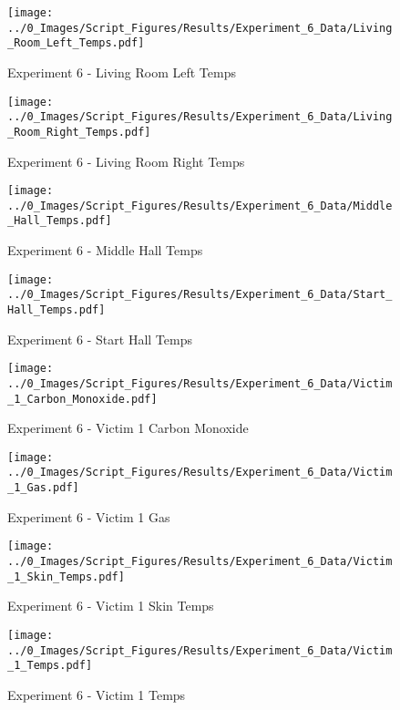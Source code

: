 	\begin{figure}[H]
		\centering
		\texttt{[image: ../0\_Images/Script\_Figures/Results/Experiment\_6\_Data/Living\_Room\_Left\_Temps.pdf]}
		\caption[]{Experiment 6 - Living Room Left Temps}
	\end{figure}
 
	\clearpage

	\begin{figure}[H]
		\centering
		\texttt{[image: ../0\_Images/Script\_Figures/Results/Experiment\_6\_Data/Living\_Room\_Right\_Temps.pdf]}
		\caption[]{Experiment 6 - Living Room Right Temps}
	\end{figure}
 

	\begin{figure}[H]
		\centering
		\texttt{[image: ../0\_Images/Script\_Figures/Results/Experiment\_6\_Data/Middle\_Hall\_Temps.pdf]}
		\caption[]{Experiment 6 - Middle Hall Temps}
	\end{figure}
 
	\clearpage

	\begin{figure}[H]
		\centering
		\texttt{[image: ../0\_Images/Script\_Figures/Results/Experiment\_6\_Data/Start\_Hall\_Temps.pdf]}
		\caption[]{Experiment 6 - Start Hall Temps}
	\end{figure}
 

	\begin{figure}[H]
		\centering
		\texttt{[image: ../0\_Images/Script\_Figures/Results/Experiment\_6\_Data/Victim\_1\_Carbon\_Monoxide.pdf]}
		\caption[]{Experiment 6 - Victim 1 Carbon Monoxide}
	\end{figure}
 
	\clearpage

	\begin{figure}[H]
		\centering
		\texttt{[image: ../0\_Images/Script\_Figures/Results/Experiment\_6\_Data/Victim\_1\_Gas.pdf]}
		\caption[]{Experiment 6 - Victim 1 Gas}
	\end{figure}
 

	\begin{figure}[H]
		\centering
		\texttt{[image: ../0\_Images/Script\_Figures/Results/Experiment\_6\_Data/Victim\_1\_Skin\_Temps.pdf]}
		\caption[]{Experiment 6 - Victim 1 Skin Temps}
	\end{figure}
 
	\clearpage

	\begin{figure}[H]
		\centering
		\texttt{[image: ../0\_Images/Script\_Figures/Results/Experiment\_6\_Data/Victim\_1\_Temps.pdf]}
		\caption[]{Experiment 6 - Victim 1 Temps}
	\end{figure}
 

